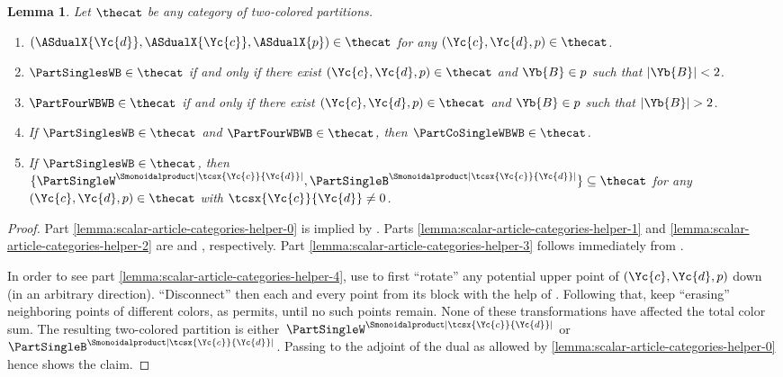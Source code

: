 \documentclass[pdftex]{sigma}
\numberwithin{equation}{section}
\newtheorem{Lemma}[Theorem]{Lemma}
\begin{document}
{
  \newcommand{\incol}{\Yc{c}}
  \newcommand{\outcol}{\Yc{d}}
  \newcommand{\thepartition}{p}
  \newcommand{\param}{t}
  \newcommand{\someblock}{\Yb{B}}
  \begin{Lemma}
    \label{lemma:scalar-article-categories-helper}
    Let $\thecat$ be any category of two-co\-lo\-red partitions.
    \begin{enumerate}
    \item\label{lemma:scalar-article-categories-helper-0}  $(\ASdualX{\outcol},\ASdualX{\incol},\ASdualX{\thepartition})\in\thecat$ for any $(\incol,\outcol,\thepartition)\in\thecat$.
    \item\label{lemma:scalar-article-categories-helper-1} $\PartSinglesWB\in\thecat$ if and only if there exist $(\incol,\outcol,\thepartition)\in\thecat$ and $\someblock\in\thepartition$ such that $|\someblock|<2$.
    \item\label{lemma:scalar-article-categories-helper-2} $\PartFourWBWB\in\thecat$ if and only if there exist $(\incol,\outcol,\thepartition)\in\thecat$ and $\someblock\in\thepartition$ such that $|\someblock|>2$.
    \item\label{lemma:scalar-article-categories-helper-3} If $\PartSinglesWB\in\thecat$ and $\PartFourWBWB\in\thecat$, then $\PartCoSingleWBWB\in\thecat$.
    \item\label{lemma:scalar-article-categories-helper-4} If $\PartSinglesWB\in\thecat$, then $\{\PartSingleW^{\Smonoidalproduct |\tcsx{\incol}{\outcol}|},\PartSingleB^{\Smonoidalproduct |\tcsx{\incol}{\outcol}|}\}\subseteq\thecat$ for any $(\incol,\outcol,\thepartition)\in \thecat$ with $\tcsx{\incol}{\outcol}\neq 0$.
    \end{enumerate}
  \end{Lemma}
  \begin{proof}
    Part \ref{lemma:scalar-article-categories-helper-0} is implied by \cite[Lemma~1.1\,(a)]{TarragoWeber2018}.
Parts \ref{lemma:scalar-article-categories-helper-1} and \ref{lemma:scalar-article-categories-helper-2} are
 \cite[Lemmas~1.3\,(b) and~2.1\,(a)]{TarragoWeber2018}
and \cite[Lemmas~1.3\,(d) and 2.1\,(b)]{TarragoWeber2018}, respectively.
Part \ref{lemma:scalar-article-categories-helper-3} follows immediately from \cite[Lemma~1.3\,(b)]{TarragoWeber2018}.

In order to see part \ref{lemma:scalar-article-categories-helper-4}, use \cite[Lemma~1.1\,(a)]{TarragoWeber2018} to first ``rotate'' any potential upper point of $(\incol,\outcol,\thepartition)$ down (in an arbitrary direction). ``Disconnect'' then each and every point from its block with the help of  \cite[Lemma~1.3\,(b)]{TarragoWeber2018}. Following that, keep ``erasing'' neighboring points of different colors,  as  \cite[Lemma~1.1\,(b)]{TarragoWeber2018} permits, until no such points remain. None of these transformations have affected the total color sum. The resulting two-colored partition is either~$\PartSingleW^{\Smonoidalproduct |\tcsx{\incol}{\outcol}|}$ or $\PartSingleB^{\Smonoidalproduct |\tcsx{\incol}{\outcol}|}$. Passing to the adjoint of the dual  as allowed by \ref{lemma:scalar-article-categories-helper-0} hence shows the claim.
  \end{proof}
}
\end{document}

